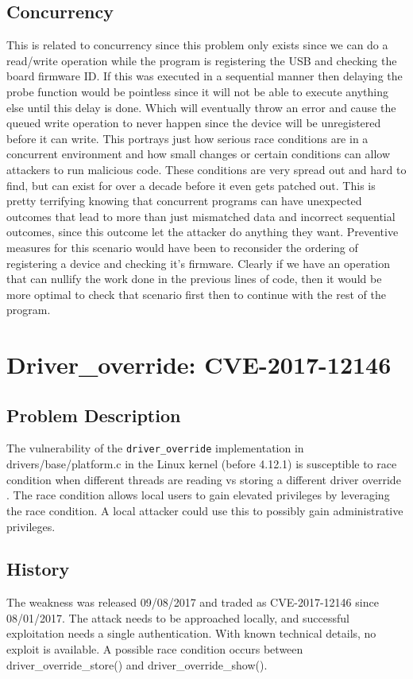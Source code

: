 \documentclass[12pt]{article}
\begin{document}
\subsection{Concurrency}
This is related to concurrency since this problem only exists since we can do a read/write operation while the program is registering the USB and checking the board firmware ID. If this was executed in a sequential manner then delaying the probe function would be pointless since it will not be able to execute anything else until this delay is done. Which will eventually throw an error and cause the queued write operation to never happen since the device will be unregistered before it can write. This portrays just how serious race conditions are in a concurrent environment and how small changes or certain conditions can allow attackers to run malicious code. These conditions are very spread out and hard to find, but can exist for over a decade before it even gets patched out. This is pretty terrifying knowing that concurrent programs can have unexpected outcomes that lead to more than just mismatched data and incorrect sequential outcomes, since this outcome let the attacker do anything they want. Preventive measures for this scenario would have been to reconsider the ordering of registering a device and checking it's firmware. Clearly if we have an operation that can nullify the work done in the previous lines of code, then it would be more optimal to check that scenario first then to continue with the rest of the program.

\newpage
\section{Driver\_override: CVE-2017-12146}
\subsection{Problem Description}
The vulnerability of the \texttt{driver\_override} implementation in drivers/base/platform.c in the Linux kernel (before 4.12.1) is susceptible to race condition when different threads are reading vs storing a different driver override \cite{bugzilla}. The race condition allows local users to gain elevated privileges by leveraging the race condition. A local attacker could use this to possibly gain administrative privileges\cite{ubuntu-security}.

\subsection{History}
The weakness was released 09/08/2017 and traded as CVE-2017-12146 since 08/01/2017. The attack needs to be approached locally, and successful exploitation needs a single authentication. With known technical details, no exploit is available\cite{vuldb}. A possible race condition occurs between driver\_override\_store() and driver\_override\_show().
\end{document}
